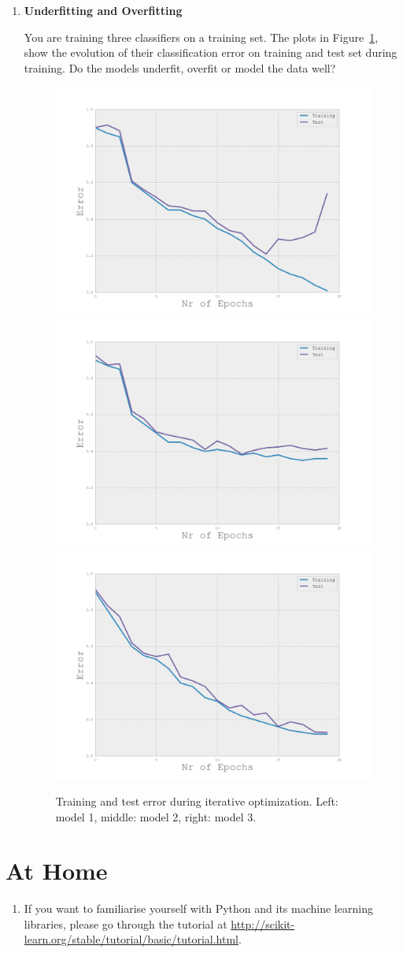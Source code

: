 \documentclass[paper=a4, fontsize=11pt]{scrartcl} %
\numberwithin{equation}{section} %
\numberwithin{figure}{section} %
\numberwithin{table}{section} %
\begin{document}
\begin{enumerate}
\item \textbf{Underfitting and Overfitting}

You are training three classifiers on a training set. The plots in Figure~\ref{fig:model1}, %
show the evolution of their classification error on training and test set during training. Do the models underfit, overfit or model the data well?
\begin{figure}[H]
\hspace{-.5cm}
\includegraphics[width=.4\textwidth]{images/model1}%
\includegraphics[width=.4\textwidth]{images/model2}%
\includegraphics[width=.4\textwidth]{images/model3}
\caption{Training and test  error during iterative optimization. Left: model 1, middle: model 2, right: model 3. }
\label{fig:model1}
\end{figure}
%

\end{enumerate}


\section{At Home}
\begin{enumerate}
\item If you want to familiarise yourself with Python and its machine learning libraries, please go through the tutorial at \url{http://scikit-learn.org/stable/tutorial/basic/tutorial.html}. %
\end{enumerate}
\end{document}
